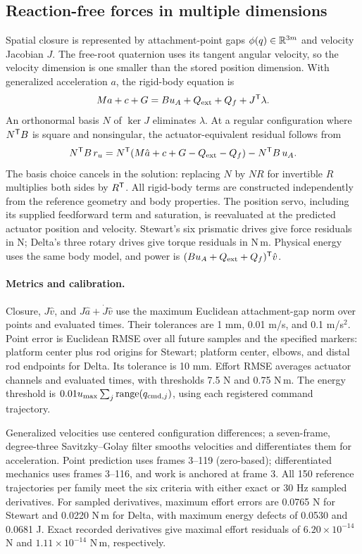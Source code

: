 \documentclass[10pt,twocolumn,letterpaper]{article}
\begin{document}
\subsection{Reaction-free forces in multiple dimensions}
Spatial closure is represented by attachment-point gaps $\phi(q)\in\mathbb{R}^{3m}$ and velocity Jacobian $J$. The free-root quaternion uses its tangent angular velocity, so the velocity dimension is one smaller than the stored position dimension. With generalized acceleration $a$, the rigid-body equation is
\begin{equation}
Ma+c+G=Bu_A+Q_{\rm ext}+Q_f+J^{\mathsf T}\lambda.
\end{equation}
An orthonormal basis $N$ of $\ker J$ eliminates $\lambda$. At a regular configuration where $N^{\mathsf T} B$ is square and nonsingular, the actuator-equivalent residual follows from
\begin{equation}
N^{\mathsf T} B\,r_u=N^{\mathsf T}(M\hat a+c+G-Q_{\rm ext}-Q_f)-N^{\mathsf T} B\,u_A.
\end{equation}
The basis choice cancels in the solution: replacing $N$ by $NR$ for invertible $R$ multiplies both sides by $R^{\mathsf T}$. All rigid-body terms are constructed independently from the reference geometry and body properties. The position servo, including its supplied feedforward term and saturation, is reevaluated at the predicted actuator position and velocity. Stewart's six prismatic drives give force residuals in N; Delta's three rotary drives give torque residuals in N\,m. Physical energy uses the same body model, and power is $(Bu_A+Q_{\rm ext}+Q_f)^{\mathsf T}\hat v$.

\paragraph{Metrics and calibration.}
Closure, $J\hat v$, and $J\hat a+\dot J\hat v$ use the maximum Euclidean attachment-gap norm over points and evaluated times. Their tolerances are 1 mm, 0.01 m/s, and 0.1 m/s$^2$. Point error is Euclidean RMSE over all future samples and the specified markers: platform center plus rod origins for Stewart; platform center, elbows, and distal rod endpoints for Delta. Its tolerance is 10 mm. Effort RMSE averages actuator channels and evaluated times, with thresholds 7.5 N and 0.75 N\,m. The energy threshold is $0.01u_{\max}\sum_j\operatorname{range}(q_{{\rm cmd},j})$, using each registered command trajectory.

Generalized velocities use centered configuration differences; a seven-frame, degree-three Savitzky--Golay filter smooths velocities and differentiates them for acceleration. Point prediction uses frames 3--119 (zero-based); differentiated mechanics uses frames 3--116, and work is anchored at frame 3. All 150 reference trajectories per family meet the six criteria with either exact or 30 Hz sampled derivatives. For sampled derivatives, maximum effort errors are 0.0765 N for Stewart and 0.0220 N\,m for Delta, with maximum energy defects of 0.0530 and 0.0681 J. Exact recorded derivatives give maximal effort residuals of $6.20\times10^{-14}$ N and $1.11\times10^{-14}$ N\,m, respectively.
\end{document}
